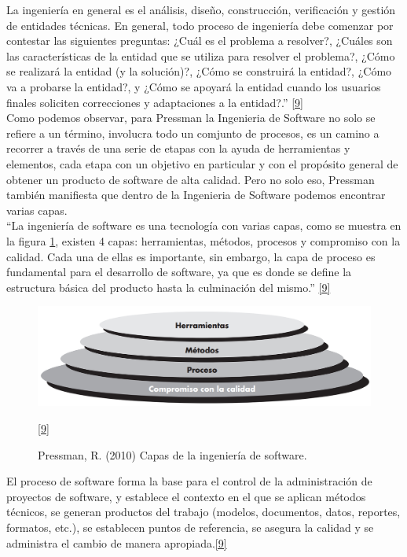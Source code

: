 La ingeniería en general es el análisis, diseño, construcción, verificación y gestión de entidades técnicas. En general, todo proceso de ingeniería debe comenzar por contestar las siguientes preguntas: ¿Cuál es el problema a
resolver?, ¿Cuáles son las características de la entidad que se utiliza para resolver el problema?, ¿Cómo se realizará la entidad (y la solución)?, ¿Cómo se construirá la entidad?, ¿Cómo va a probarse la entidad?, y ¿Cómo se apoyará la entidad cuando los usuarios finales soliciten correcciones y adaptaciones a la entidad?.''  \hyperlink{b09}{[9]} \\

Como podemos observar, para Pressman la Ingenieria de Software no solo se refiere a un término, involucra todo un comjunto de procesos, es un camino a recorrer a través de una serie de etapas con la ayuda de herramientas y elementos, cada etapa con un objetivo en particular y con el propósito general de obtener un producto de software de alta calidad. Pero no solo eso, Pressman también manifiesta que dentro de la Ingenieria de Software podemos encontrar varias capas.\\ 

``La ingeniería de software es una tecnología con varias capas, como se muestra en la figura \ref{fig:capas_is}, existen 4 capas: herramientas, métodos, procesos y compromiso con la calidad. Cada una de ellas es importante, sin embargo, la capa de proceso es fundamental para el desarrollo de software, ya que es donde se define la estructura básica del producto hasta la culminación del mismo.''  \hyperlink{b09}{[9]} \\

\begin{figure}[H]
	\begin{center}
		\includegraphics[width=.95\textwidth]{images/CapasIS}
		\caption{Pressman, R. (2010) Capas de la ingeniería de software.}
		\hyperlink{b09}{[9]}
		\label{fig:capas_is}
	\end{center}
\end{figure}

El proceso de software forma la base para el control de la administración de proyectos de software, y establece el contexto en el que se aplican métodos técnicos, se generan productos del trabajo (modelos, documentos, datos, reportes, formatos, etc.), se establecen puntos de referencia, se asegura la calidad y se administra el cambio de manera apropiada.\hyperlink{b09}{[9]} 

